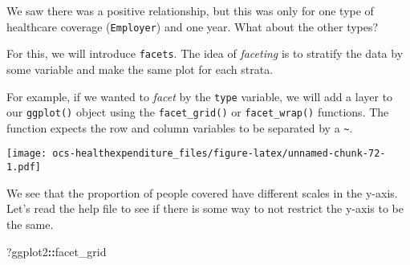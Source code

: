 \documentclass[]{article}
\newenvironment{Shaded}{\begin{snugshade}}{\end{snugshade}}
\newcommand{\DataTypeTok}[1]{\textcolor[rgb]{0.13,0.29,0.53}{#1}}
\newcommand{\KeywordTok}[1]{\textcolor[rgb]{0.13,0.29,0.53}{\textbf{#1}}}
\newcommand{\NormalTok}[1]{#1}
\newcommand{\OperatorTok}[1]{\textcolor[rgb]{0.81,0.36,0.00}{\textbf{#1}}}
\newcommand{\StringTok}[1]{\textcolor[rgb]{0.31,0.60,0.02}{#1}}
\begin{document}
We saw there was a positive relationship, but this was only for one type
of healthcare coverage (\texttt{Employer}) and one year. What about the
other types?

For this, we will introduce \texttt{facets}. The idea of \emph{faceting}
is to stratify the data by some variable and make the same plot for each
strata.

For example, if we wanted to \emph{facet} by the \texttt{type} variable,
we will add a layer to our \texttt{ggplot()} object using the
\texttt{facet\_grid()} or \texttt{facet\_wrap()} functions. The function
expects the row and column variables to be separated by a
\texttt{\textasciitilde{}}.

\begin{Shaded}
\end{Shaded}

\texttt{[image: ocs-healthexpenditure\_files/figure-latex/unnamed-chunk-72-1.pdf]}

We see that the proportion of people covered have different scales in
the y-axis. Let's read the help file to see if there is some way to not
restrict the y-axis to be the same.

\begin{Shaded}
\begin{Highlighting}[]
\NormalTok{?ggplot2}\OperatorTok{::}\NormalTok{facet_grid}
\end{Highlighting}
\end{Shaded}
\end{document}
